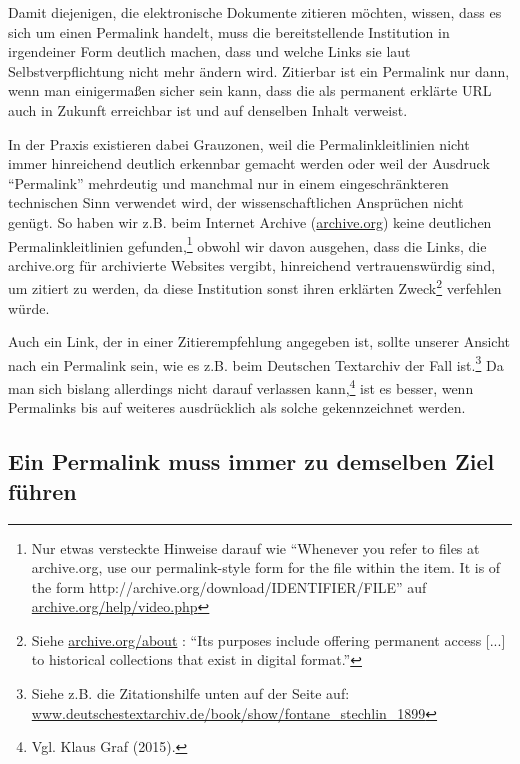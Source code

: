\documentclass[12pt, a4paper]{article}
\begin{document}
Damit diejenigen, die elektronische Dokumente zitieren möchten,
wissen, dass es sich um einen Permalink handelt, muss die
bereitstellende Institution in irgendeiner Form deutlich machen, dass
und welche Links sie laut Selbstverpflichtung nicht mehr ändern
wird. Zitierbar ist ein Permalink nur dann, wenn man einigermaßen
sicher sein kann, dass die als permanent erklärte URL auch in Zukunft
erreichbar ist und auf denselben Inhalt verweist.

In der Praxis existieren dabei Grauzonen, weil die
Permalinkleitlinien nicht immer hinreichend deutlich erkennbar
gemacht werden oder weil der Ausdruck "`Permalink"' mehrdeutig und
manchmal nur in einem eingeschränkteren technischen Sinn verwendet
wird, der wissenschaftlichen Ansprüchen nicht genügt. So haben wir
z.B. beim Internet Archive (\href{https://archive.org/}{archive.\-org})
keine deutlichen Permalinkleitlinien gefunden,\footnote{Nur etwas
  versteckte Hinweise darauf wie "`Whenever you refer to files at
  archive.org, use our permalink-style form for the file within the
  item. It is of the form
  http://archive.org/download/IDENTIFIER/FILE"' auf
  \href{https://archive.org/help/video.php}{archive.org/\-help/\-video.php}}
obwohl wir davon ausgehen, dass die Links, die archive.org für
archivierte Websites vergibt, hinreichend vertrauenswürdig sind, um
zitiert zu werden, da diese Institution sonst ihren erklärten
Zweck\footnote{Siehe
  \href{https://archive.org/about/}{archive.org/about} : ``Its
  purposes include offering permanent access [...] to historical
  collections that exist in digital format.''}  verfehlen würde.

Auch ein Link, der in einer Zitierempfehlung angegeben ist, sollte
unserer Ansicht nach ein Permalink sein, wie es z.B. beim Deutschen
Textarchiv der Fall ist.\footnote{Siehe z.B. die Zitationshilfe unten
  auf der Seite auf:
  \href{http://www.deutschestextarchiv.de/book/show/fontane\_stechlin\_1899}{www.\-deutschestextarchiv.\-de/\-book/\-show/\-fontane\_stechlin\_1899}}
Da man sich bislang allerdings nicht darauf verlassen
kann,\footnote{Vgl. Klaus Graf (2015).} ist es besser, wenn Permalinks
bis auf weiteres ausdrücklich als solche gekennzeichnet werden.

\subsection{Ein Permalink muss immer zu demselben Ziel führen}
\label{ein-permalink-muss-immer-zu-demselben-ziel-fuehren}
\end{document}
